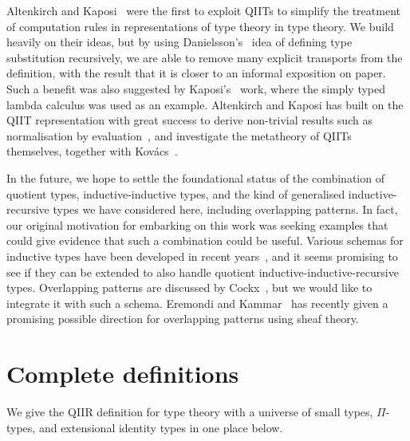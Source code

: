 \documentclass[a4paper,UKenglish,numberwithinsect,cleveref,thm-restate]{lipics-v2021}
\newcommand{\LT}[2][]{\todo[inline,author={L-T},caption={},color={pink},#1]{#2}}
\begin{document}
Altenkirch and Kaposi~\cite{Altenkirch2016a} were the first to exploit QIITs to simplify the treatment of computation rules in representations of type theory in type theory. We build heavily on their ideas, but by using Danielsson's~\cite{Danielsson2006} idea of defining type substitution recursively, we are able to remove many explicit transports from the definition, with the result that it is closer to an informal exposition on paper. Such a benefit was also suggested by Kaposi's~\cite{Kaposi2023} work, where the simply typed lambda calculus was used as an example. Altenkirch and Kaposi has built on the QIIT representation with great success to derive non-trivial results such as normalisation by evaluation~\cite{Altenkirch2017}, and investigate the metatheory of QIITs themselves, together with Kov\'acs~\cite{Kaposi2019}.

In the future, we hope to settle the foundational status of the
combination of quotient types, inductive-inductive types, and the kind
of generalised inductive-recursive types we have considered here,
including overlapping patterns. In fact, our original motivation for
embarking on this work was seeking examples that could give evidence
that such a combination could be useful.
%
Various schemas for inductive types have been developed in recent
years~\cite{Ghani2017,Kaposi2018,Kovacs2023}, and it seems
promising to see if they can be extended to also handle quotient
inductive-inductive-recursive types. Overlapping patterns are
discussed by Cockx~\cite{Cockx2014}, but we would like to integrate it
with such a schema. Eremondi and Kammar~\cite{Eremondi2025} has
recently given a promising possible direction for overlapping patterns
using sheaf theory.



\appendix

\section{Complete definitions}\label{appendix:full-def}
We give the QIIR definition for type theory with a universe of small types, $\Pi$-types, and extensional identity types in one place below.
\end{document}

